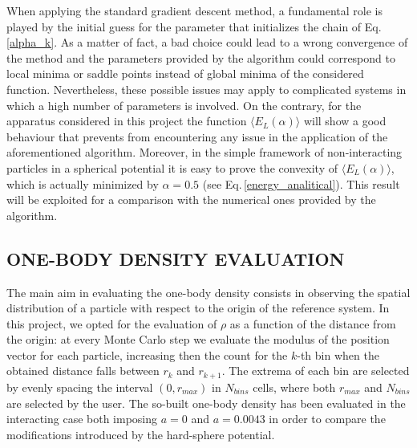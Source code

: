 When applying the standard gradient descent method, a fundamental role is played by the initial guess for the parameter that initializes the chain of Eq.\,\ref{alpha_k}. As a matter of fact, a bad choice could lead to a wrong convergence of the method and the parameters provided by the algorithm could correspond to local minima or saddle points instead of global minima of the considered function. Nevertheless, these possible issues may apply to complicated systems in which a high number of parameters is involved. On the contrary, for the apparatus considered in this project the function $\langle E_L(\alpha) \rangle$ will show a good behaviour that prevents from encountering any issue in the application of the aforementioned algorithm. Moreover, in the simple framework of non-interacting particles in a spherical potential it is easy to prove the convexity of $\langle E_L(\alpha) \rangle$, which is actually minimized by $\alpha=0.5$ (see Eq.\,\ref{energy_analitical}). This result will be exploited for a comparison with the numerical ones provided by the algorithm. 



\subsection{ONE-BODY DENSITY EVALUATION}
\label{sec:one_body_density}
The main aim in evaluating the one-body density consists in observing the spatial distribution of a particle with respect to the origin of the reference system. In this project, we opted for the evaluation of $\rho$ as a function of the distance from the origin: at every Monte Carlo step we evaluate the modulus of the position vector for each particle, increasing then the count for the $k$-th bin when the obtained distance falls between $r_k$ and $r_{k+1}$. The extrema of each bin are selected by evenly spacing the interval $(0, r_{max})$ in $N_{bins}$ cells, where both $r_{max}$ and $N_{bins}$ are selected by the user. The so-built one-body density has been evaluated in the interacting case both imposing $a=0$ and $a=0.0043$ in order to compare the modifications introduced by the hard-sphere potential.


